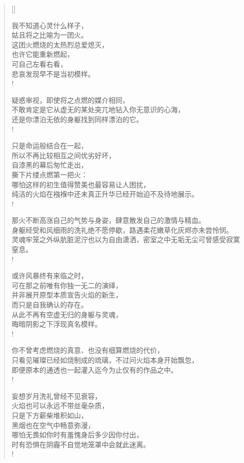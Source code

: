 \documentclass[UTF8, 12pt, a4paper]{ctexrep} %
\begin{document}
\begin{verse}[\versewidth]

我不知道心灵什么样子，\\
姑且将之比喻为一团火。\\
这团火燃烧的太热烈总爱熄灭，\\
也许它能重新燃起，\\
可自己左看右看，\\
悲哀发现早不是当初模样。\\!

疑惑审视，即使将之点燃的媒介相同，\\
不敢肯定是它从虚无的某处突兀地钻入你无意识的心海，\\
还是你漂泊无依的身躯找到同样漂泊的它。\\!

只是命运般结合在一起，\\
所以不再比较相互之间优劣好坏，\\
自漆黑的幕后匆忙走出，\\
撕下片缕点燃第一把火：\\
哪怕这样的初生值得赞美也最容易让人困扰，\\
纯洁的火焰在襁褓中还未真正升华已经开始迫不及待地展示。\\!

那火不断高涨自己的气势与身姿，肆意散发自己的激情与精血。\\
身躯经受和风细雨的洗礼绝不愿停歇，路遇柔花嫩草化灰烬亦未尝怜悯。\\
灵魂牢笼之外纵肮脏泥泞也以为自由潇洒，密室之中无垢无尘可曾感受寂寞窒息。\\!

或许风暴终有来临之时，\\
可在那之前唯有你独一无二的演绎，\\
并非展开原型本质宣告火焰的新生，\\
而只是自我确认的存在。\\
从此不再有空虚无归的身躯与灵魂，\\
晦暗阴影之下浮现真名模样。\\!

你不曾考虑燃烧的真意、也没有细算燃烧的代价，\\
只看见璀璨已经如烧制成的琉璃，不过问火焰本身开始飘忽，\\
即便原本的通透也一起灌入迄今为止仅有的作品之中。\\!

妄想岁月洗礼曾经不见衰容，\\
火焰也可以永远不带丝毫杂质，\\
只是下方薪柴堆积如山，\\
黑烟也在空气中畅意弥漫，\\
哪怕无畏如你时有羞愧身后多少因你付出，\\
时有恐惧在阴霾不自觉地笼罩中会就此迷离。\\!


\end{verse}
\end{document}
